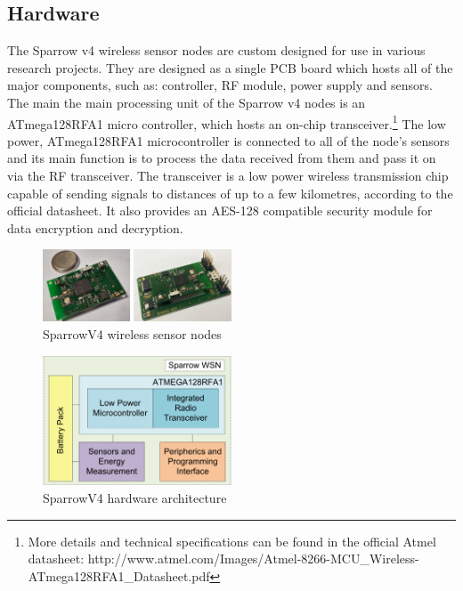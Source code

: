 \subsection{Hardware}

The Sparrow v4 wireless sensor nodes are custom designed for use in various research projects.
They are designed as a single PCB board which hosts all of the major components, such as: controller,
RF module, power supply and sensors. The main the main processing unit of the Sparrow v4 nodes is an ATmega128RFA1 micro controller, 
which hosts an on-chip transceiver.\footnote{More details and technical specifications can be found in the official Atmel datasheet: http://www.atmel.com/Images/Atmel-8266-MCU_Wireless-ATmega128RFA1_Datasheet.pdf} 
The low power, ATmega128RFA1 microcontroller is connected to all of the node's sensors and its
main function is to process the data received from them and pass it on via the RF transceiver. The transceiver 
is a low power wireless transmission chip capable of sending signals to distances of up to a few kilometres, according 
to the official datasheet. It also provides an AES-128 compatible security module for data encryption and decryption.

\begin{figure}[ht] \centering
  \includegraphics[width=0.5\textwidth]{img/sparrow-v4.png}
  \caption{SparrowV4 wireless sensor nodes}
\end{figure}

\begin{figure}[ht] \centering
  \includegraphics[width=0.5\textwidth]{img/sparrow-v4-arch.png}
  \caption{SparrowV4 hardware architecture}
\end{figure}

